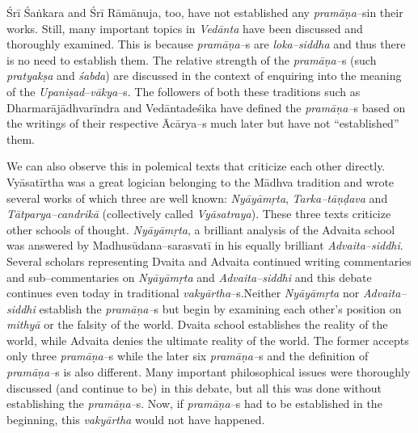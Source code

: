Śrī Śaṅkara and Śrī Rāmānuja, too, have not established any \textit{pramāṇa–}s\break in their works. Still, many important topics in \textit{Vedānta} have been discussed and thoroughly examined. This is because \textit{pramāṇa–}s are \textit{loka–siddha} and thus there is no need to establish them. The relative strength of the \textit{pramāṇa–}s (such \textit{pratyakṣa} and \textit{śabda}) are discussed in the context of enquiring into the meaning of the \textit{Upaniṣad}–\textit{vākya}–s. The followers of both these traditions such as Dharmarājādhvarīndra and Vedāntadeśika have defined the \textit{pramāṇa–}s based on the writings of their respective Ācārya–s much later but have not “established” them.

We can also observe this in polemical texts that criticize each other directly. Vyāsatīrtha was a great logician belonging to the Mādhva tradition and wrote several works of which three are well known: \textit{Nyāyāmṛta}, \textit{Tarka–tāṇḍava} and \textit{Tātparya–candrikā} (collectively called \textit{Vyāsatraya}). These three texts criticize other schools of thought. \textit{Nyāyāmṛta}, a brilliant analysis of the Advaita school was answered by Madhusūdana–sarasvatī in his equally brilliant \textit{Advaita–siddhi}. Several scholars representing Dvaita and Advaita continued writing commentaries and sub–commentaries on \textit{Nyāyāmṛta} and \textit{Advaita–siddhi} and this debate continues even today in traditional \textit{vakyārtha}–s.\break Neither \textit{Nyāyāmṛta} nor \textit{Advaita–siddhi} establish the \textit{pramāṇa–}s but begin by examining each other’s position on \textit{mithyā} or the falsity of the world. Dvaita school establishes the reality of the world, while Advaita denies the ultimate reality of the world. The former accepts only three \textit{pramāṇa–}s while the later six \textit{pramāṇa–}s and the definition of \textit{pramāṇa–}s is also different. Many important philosophical issues were thoroughly discussed (and continue to be) in this debate, but all this was done without establishing the \textit{pramāṇa–}s. Now, if \textit{pramāṇa–}s had to be established in the beginning, this \textit{vakyārtha} would not have happened.

